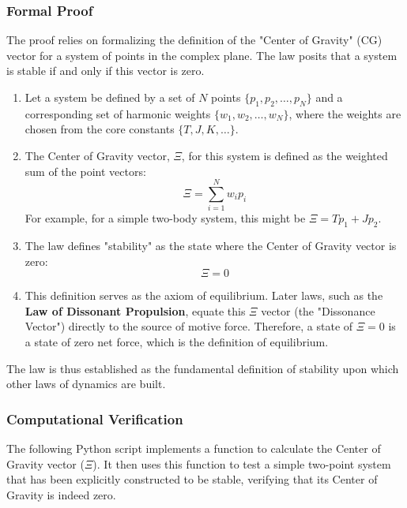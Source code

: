 \subsubsection*{Formal Proof}
The proof relies on formalizing the definition of the "Center of Gravity" (CG) vector for a system of points in the complex plane. The law posits that a system is stable if and only if this vector is zero.

\begin{enumerate}
    \item Let a system be defined by a set of $N$ points $\{p_1, p_2, \dots, p_N\}$ and a corresponding set of harmonic weights $\{w_1, w_2, \dots, w_N\}$, where the weights are chosen from the core constants $\{T, J, K, \dots\}$.

    \item The Center of Gravity vector, $\Xi$, for this system is defined as the weighted sum of the point vectors:
    $$ \Xi = \sum_{i=1}^{N} w_i p_i $$
    For example, for a simple two-body system, this might be $\Xi = T p_1 + J p_2$.

    \item The law defines "stability" as the state where the Center of Gravity vector is zero:
    $$ \Xi = 0 $$
    
    \item This definition serves as the axiom of equilibrium. Later laws, such as the \textbf{Law of Dissonant Propulsion}, equate this $\Xi$ vector (the "Dissonance Vector") directly to the source of motive force. Therefore, a state of $\Xi = 0$ is a state of zero net force, which is the definition of equilibrium.
\end{enumerate}
The law is thus established as the fundamental definition of stability upon which other laws of dynamics are built.

\subsubsection*{Computational Verification}
The following Python script implements a function to calculate the Center of Gravity vector ($\Xi$). It then uses this function to test a simple two-point system that has been explicitly constructed to be stable, verifying that its Center of Gravity is indeed zero.


